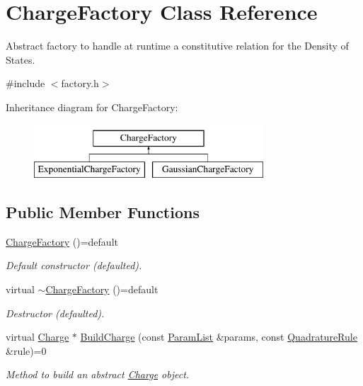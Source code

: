 \hypertarget{classChargeFactory}{\section{Charge\-Factory Class Reference}
\label{classChargeFactory}
}


Abstract factory to handle at runtime a constitutive relation for the Density of States.  




{\ttfamily \#include $<$factory.\-h$>$}

Inheritance diagram for Charge\-Factory\-:\begin{figure}[H]
\begin{center}
\leavevmode
\includegraphics[height=2.000000cm]{classChargeFactory}
\end{center}
\end{figure}
\subsection*{Public Member Functions}
\begin{DoxyCompactItemize}
\item 
\hypertarget{classChargeFactory_ac9cd065aedc271933d5d9ee8f82bc76b}{\hyperlink{classChargeFactory_ac9cd065aedc271933d5d9ee8f82bc76b}{Charge\-Factory} ()=default}\label{classChargeFactory_ac9cd065aedc271933d5d9ee8f82bc76b}

\begin{DoxyCompactList}\small\item\em Default constructor (defaulted). \end{DoxyCompactList}\item 
\hypertarget{classChargeFactory_a311f54993f661651542b1fb5cec17692}{virtual \hyperlink{classChargeFactory_a311f54993f661651542b1fb5cec17692}{$\sim$\-Charge\-Factory} ()=default}\label{classChargeFactory_a311f54993f661651542b1fb5cec17692}

\begin{DoxyCompactList}\small\item\em Destructor (defaulted). \end{DoxyCompactList}\item 
virtual \hyperlink{classCharge}{Charge} $\ast$ \hyperlink{classChargeFactory_ad4b190a88028e2e195fc5c5a4cfdcf70}{Build\-Charge} (const \hyperlink{classParamList}{Param\-List} \&params, const \hyperlink{classQuadratureRule}{Quadrature\-Rule} \&rule)=0
\begin{DoxyCompactList}\small\item\em Method to build an abstract \hyperlink{classCharge}{Charge} object. \end{DoxyCompactList}\end{DoxyCompactItemize}


